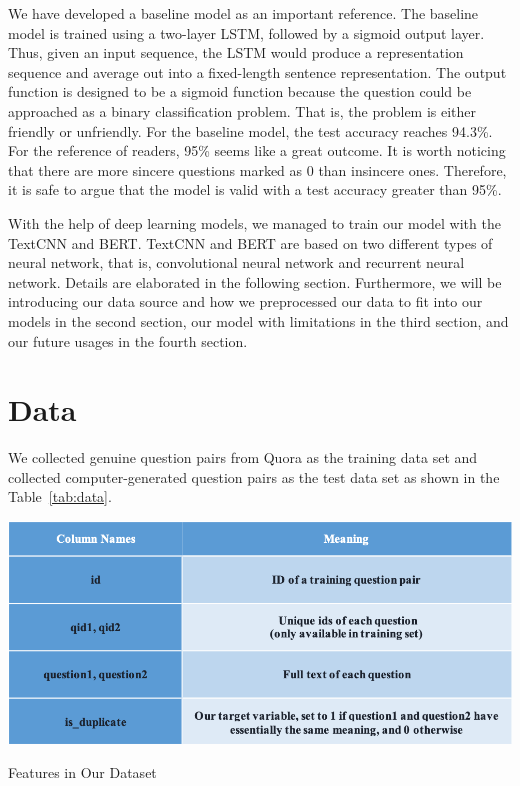 \documentclass{article}
\begin{document}
We have developed a baseline model as an important reference. The baseline model is trained using a two-layer LSTM, followed by a sigmoid output layer. Thus, given an input sequence, the LSTM would produce a representation sequence and average out into a fixed-length sentence representation. The output function is designed to be a sigmoid function because the question could be approached as a binary classification problem. That is, the problem is either friendly or unfriendly. For the baseline model, the test  accuracy reaches 94.3\%. For the reference of readers, 95\% seems like a great outcome. It is worth noticing that there are more sincere questions marked as 0 than insincere ones. Therefore, it is safe to argue that the model is valid with a test accuracy greater than 95\%.

With the help of deep learning models, we managed to train our model with the TextCNN and BERT. TextCNN and BERT are based on two different types of neural network, that is, convolutional neural network and recurrent neural network.  Details are elaborated in the following section. Furthermore, we will be introducing our data source and how we preprocessed our data to fit into our models in the second section, our model with limitations in the third section, and our future usages in the fourth section.


\section{Data}
We collected genuine question pairs from Quora as the training data set and collected computer-generated question pairs as the test data set as shown in the Table~\ref{tab:data}. 

\begin{table}[h!]
	\centering
	\includegraphics[scale=0.8]{data.png}
	\caption{Features in Our Dataset}
	\label{tab:data}
\end{table}
\end{document}
